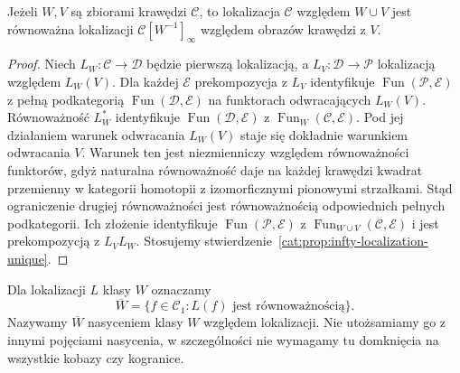\begin{stwierdzenie}\label{cat:prop:infty-localization-iterated}
Jeżeli $W,V$ są zbiorami krawędzi $\mathcal C$, to lokalizacja $\mathcal C$ względem $W\cup V$ jest równoważna lokalizacji $\mathcal C[W^{-1}]_\infty$ względem obrazów krawędzi z $V$.
\end{stwierdzenie}
\begin{proof}
Niech $L_W:\mathcal C\to\mathcal D$ będzie pierwszą lokalizacją, a $L_V:\mathcal D\to\mathcal P$ lokalizacją względem $L_W(V)$. Dla każdej $\mathcal E$ prekompozycja z $L_V$ identyfikuje $\operatorname{Fun}(\mathcal P,\mathcal E)$ z pełną podkategorią $\operatorname{Fun}(\mathcal D,\mathcal E)$ na funktorach odwracających $L_W(V)$. Równoważność $L_W^*$ identyfikuje $\operatorname{Fun}(\mathcal D,\mathcal E)$ z $\operatorname{Fun}_W(\mathcal C,\mathcal E)$. Pod jej działaniem warunek odwracania $L_W(V)$ staje się dokładnie warunkiem odwracania $V$. Warunek ten jest niezmienniczy względem równoważności funktorów, gdyż naturalna równoważność daje na każdej krawędzi kwadrat przemienny w kategorii homotopii z izomorficznymi pionowymi strzałkami. Stąd ograniczenie drugiej równoważności jest równoważnością odpowiednich pełnych podkategorii. Ich złożenie identyfikuje $\operatorname{Fun}(\mathcal P,\mathcal E)$ z $\operatorname{Fun}_{W\cup V}(\mathcal C,\mathcal E)$ i jest prekompozycją z $L_VL_W$. Stosujemy stwierdzenie~\ref{cat:prop:infty-localization-unique}.
\end{proof}

\begin{definicja}\label{cat:def:infty-localization-saturation}
Dla lokalizacji $L$ klasy $W$ oznaczamy
\[
 \overline W=\{f\in\mathcal C_1:L(f)\text{ jest równoważnością}\}.
\]
Nazywamy $\overline W$ nasyceniem klasy $W$ względem lokalizacji. Nie utożsamiamy go z innymi pojęciami nasycenia, w szczególności nie wymagamy tu domknięcia na wszystkie kobazy czy kogranice.
\end{definicja}

